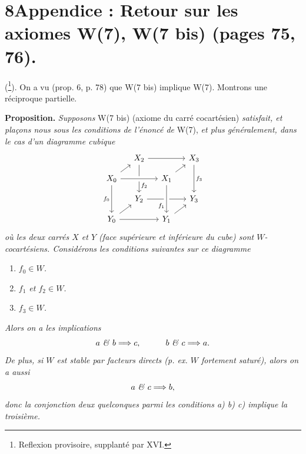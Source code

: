 \documentclass[11pt]{article}
\newcommand{\msp}[1]{\marginpar{\footnotesize [#1]}}
\begin{document}
\msp{page 265}

\section*{8\quad Appendice : Retour sur les axiomes W(7), W(7 bis) (pages 75, 76).}

(\footnote[135]{Reflexion provisoire, supplanté par XVI.}). On a vu (prop. 6, p. 78) que W(7 bis) implique W(7). Montrons une réciproque partielle. %

\textbf{Proposition.} \textit{Supposons} W(7 bis) (axiome du carré cocartésien) \textit{satisfait, et plaçons nous sous les conditions de l'énoncé de} W(7), \textit{et plus généralement, dans le cas d'un diagramme cubique}
\[
\begin{tikzcd}[ampersand replacement=\&, row sep=small, column sep=small]
 \& X_2 \arrow[rr] \arrow[dd, "f_2" near end] \& \& X_3 \arrow[dd, "f_3"] \\
X_0 \arrow[ur] \arrow[rr, crossing over] \arrow[dd, "f_0"'] \& \& X_1 \arrow[ur] \& \\
 \& Y_2 \arrow[rr] \& \& Y_3 \\
Y_0 \arrow[ur] \arrow[rr] \& \& Y_1 \arrow[ur] \arrow[from=uu, crossing over, "f_1"' near end] \&
\end{tikzcd}
\]
\textit{où les deux carrés $X$ et $Y$ (face supérieure et inférieure du cube) sont $W$-cocartésiens. Considérons les conditions suivantes sur ce diagramme}
\begin{enumerate}[label={}]
\item[\textit{a)}] \textit{$f_0 \in W$.}
\item[\textit{b)}] \textit{$f_1$ et $f_2 \in W$.}
\item[\textit{c)}] \textit{$f_3 \in W$.}
\end{enumerate}
\textit{Alors on a les implications}
\[
a \text{ \textit{\&} } b \Longrightarrow c, \qquad\quad b \text{ \textit{\&} } c \Longrightarrow a.
\]
\textit{De plus, si $W$ est stable par facteurs directs (p. ex. $W$ fortement saturé), alors on a aussi}
\[
a \text{ \textit{\&} } c \Longrightarrow b,
\]
\textit{donc la conjonction} \textit{deux quelconques parmi les conditions a) b) c) implique la troisième.}
\end{document}

